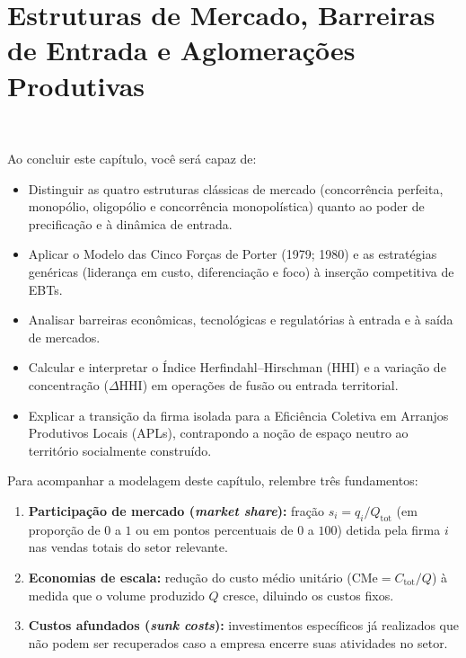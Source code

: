\chapter{Estruturas de Mercado, Barreiras de Entrada e Aglomerações Produtivas}
\ \tagTerritorio

\begin{capObjetivos}
Ao concluir este capítulo, você será capaz de:
\begin{itemize}[leftmargin=1.4em, itemsep=2pt]
  \item Distinguir as quatro estruturas clássicas de mercado (concorrência perfeita, monopólio, oligopólio e concorrência monopolística) quanto ao poder de precificação e à dinâmica de entrada.
  \item Aplicar o Modelo das Cinco Forças de Porter (1979; 1980) e as estratégias genéricas (liderança em custo, diferenciação e foco) à inserção competitiva de EBTs.
  \item Analisar barreiras econômicas, tecnológicas e regulatórias à entrada e à saída de mercados.
  \item Calcular e interpretar o Índice Herfindahl--Hirschman ($\text{HHI}$) e a variação de concentração ($\Delta \text{HHI}$) em operações de fusão ou entrada territorial.
  \item Explicar a transição da firma isolada para a Eficiência Coletiva em Arranjos Produtivos Locais (APLs), contrapondo a noção de espaço neutro ao território socialmente construído.
\end{itemize}
\end{capObjetivos}

\begin{capRevisao}
Para acompanhar a modelagem deste capítulo, relembre três fundamentos:
\begin{enumerate}[leftmargin=1.4em, itemsep=2pt]
  \item \textbf{Participação de mercado (\textit{market share}):} fração $s_i = q_i / Q_{\text{tot}}$ (em proporção de $0$ a $1$ ou em pontos percentuais de $0$ a $100$) detida pela firma $i$ nas vendas totais do setor relevante.
  \item \textbf{Economias de escala:} redução do custo médio unitário ($\text{CMe} = C_{\text{tot}} / Q$) à medida que o volume produzido $Q$ cresce, diluindo os custos fixos.
  \item \textbf{Custos afundados (\textit{sunk costs}):} investimentos específicos já realizados que não podem ser recuperados caso a empresa encerre suas atividades no setor.
\end{enumerate}
\end{capRevisao}

